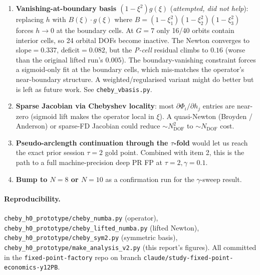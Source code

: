 \documentclass[11pt]{article}
\begin{document}
\begin{enumerate}
\item \textbf{Vanishing-at-boundary basis $(1-\xi^2)g(\xi)$} (\emph{attempted,
did not help}): replacing $h$ with $B(\xi)\cdot g(\xi)$ where
$B = (1-\xi_1^2)(1-\xi_2^2)(1-\xi_3^2)$ forces $h\to 0$ at the boundary cells.
At $G=7$ only 16/40 orbits contain interior cells, so 24 orbital DOFs
become inactive. The Newton converges to slope$=0.337$, deficit$=0.082$, but the
\emph{P-cell} residual climbs to $0.16$ (worse than the original lifted run's
$0.005$). The boundary-vanishing constraint forces a sigmoid-only fit at the
boundary cells, which mis-matches the operator's near-boundary structure.
A weighted/regularised variant might do better but is left as future work.
See \texttt{cheby\_vbasis.py}.
\item \textbf{Sparse Jacobian via Chebyshev locality}: most $\partial \Phi_i / \partial h_j$
entries are near-zero (sigmoid lift makes the operator local in $\xi$). A
quasi-Newton (Broyden / Anderson) or sparse-FD Jacobian could reduce
$\sim N_{\mathrm{DOF}}^2$ to $\sim N_{\mathrm{DOF}}$ cost.
\item \textbf{Pseudo-arclength continuation through the $\tau$-fold} would
let us reach the exact prior session $\tau=2$ gold point. Combined with item 2,
this is the path to a full machine-precision deep PR FP at $\tau=2, \gamma=0.1$.
\item \textbf{Bump to $N=8$ or $N=10$} as a confirmation run for the $\gamma$-sweep
result.
\end{enumerate}

\paragraph{Reproducibility.}
\texttt{cheby\_h0\_prototype/cheby\_numba.py} (operator),
\texttt{cheby\_h0\_prototype/cheby\_lifted\_numba.py} (lifted Newton),
\texttt{cheby\_h0\_prototype/cheby\_sym2.py} (symmetric basis),
\texttt{cheby\_h0\_prototype/make\_analysis\_v2.py} (this report's figures).
All committed in the \texttt{fixed-point-factory} repo on branch
\texttt{claude/study-fixed-point-economics-y12PB}.
\end{document}
